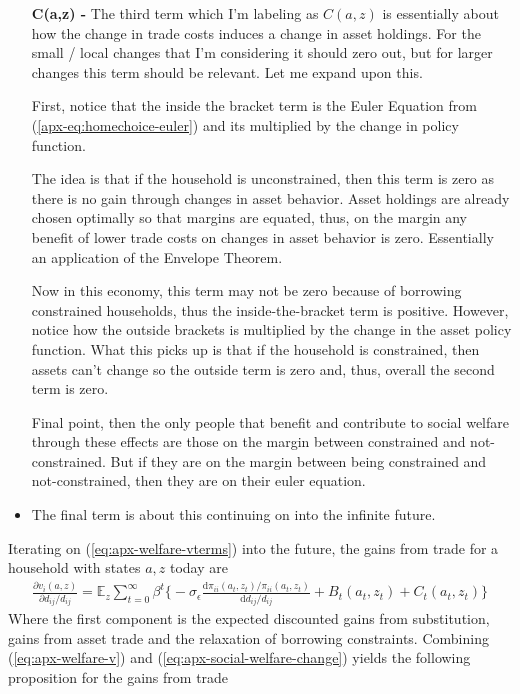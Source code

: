 \documentclass[12pt,pdftex]{article}
\begin{document}
\begin{onehalfspacing}
\begin{itemize}
\item[\textbf{C(a,z) -}]  The third term which I'm labeling as $C(a,z)$ is essentially about how the change in trade costs induces a change in asset holdings. For the small / local changes that I'm considering it should zero out, but for larger changes this term should be relevant. Let me expand upon this.
    
    First, notice that the inside the bracket term is the Euler Equation from (\ref{apx-eq:homechoice-euler}) and its multiplied by the change in policy function. 

    The idea is that if the household is unconstrained, then this term is zero as there is no gain through changes in asset behavior. Asset holdings are already chosen optimally so that margins are equated, thus, on the margin any benefit of lower trade costs on changes in asset behavior is zero. Essentially an application of the Envelope Theorem.

    Now in this economy, this term may not be zero because of borrowing constrained households, thus the inside-the-bracket term is positive. However, notice how the outside brackets is multiplied by the change in the asset policy function. What this picks up is that if the household is constrained, then assets can't change so the outside term is zero and, thus, overall the second term is zero.

    Final point, then the only people that benefit and contribute to social welfare through these effects are those on the margin between constrained and not-constrained. But if they are on the margin between being constrained and not-constrained, then they are on their euler equation. 
    
\item The final term is about this continuing on into the infinite future.
\end{itemize}
Iterating on (\ref{eq:apx-welfare-vterms}) into the future, the gains from trade for a household with states $a,z$ today are
\begin{align}
\frac{\partial v_i(a, z)}{\partial d_{ij} / d_{ij}} = \mathbb{E}_{z} \sum_{t = 0}^{\infty} \beta^{t} \bigg \{ -\sigma_{\epsilon} \frac{\mathrm{d} \pi_{ii}(a_{t},z_{t}) / \pi_{ii}(a_{t},z_{t})}{\mathrm{d}d_{ij} / d_{ij}} + B_{t}(a_{t},z_{t}) + C_{t}(a_{t},z_{t}) \bigg \}
\label{eq:apx-welfare-v}
\end{align}
Where the first component is the expected discounted gains from substitution, gains from asset trade and the relaxation of borrowing constraints. Combining (\ref{eq:apx-welfare-v}) and (\ref{eq:apx-social-welfare-change}) yields the following proposition for the gains from trade


\end{onehalfspacing}
\end{document}
